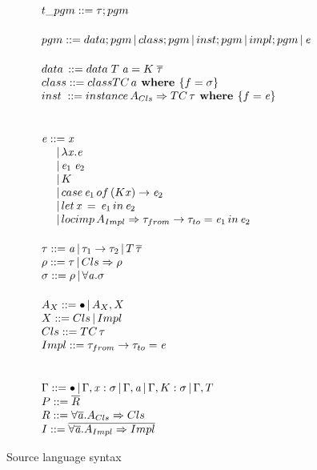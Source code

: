 \documentclass{article}
\begin{document}
\begin{figure}
  \[
\begin{array}{@{\hspace{0mm}}l@{\hspace{0mm}}}  
  t\_pgm ::= \type;pgm\\[5mm]
  pgm ::= data;pgm\,|\,class;pgm\,|\,inst;pgm\,|\,impl;pgm\,|\,\term
  \\[5mm]
 data\,::= data\;T\;\tyVar=K\;\overline{\type}\\
 class ::=class TC\,a\textbf{ where }\{f=\typeS\}\\
 inst\;::=instance\,A_{Cls}\Rightarrow TC \,\type\textbf{ where }\{f=\term\}\\

  \\[5mm]

  \term ::= \tmVar\\
  \phantom{\term ::}|\,\lambda \tmVar.\term\\
  \phantom{\term ::}|\,\term_1 \; \term_2\\
  \phantom{\term ::}|\, K\\
  \phantom{\term ::}|\, case \, \term_1 \, of\, (K \tmVar) \rightarrow \term_2\\
  \phantom{\term ::}|\, let \, \tmVar \, =\, \term_1 \,in\, \term_2  \\
  \phantom{\term ::}|\, \iLocal{A_{Impl}}{\type_{from}}{\type_{to}}{\term_1}{\term_2}
  \\[5mm]
  \type ::= \tyVar\,|\,\type_1\to\type_2\,|\,T\,\overline{\type}\\
  \qtype ::= \type\,|\,Cls \Rightarrow \qtype\\
  \typeS ::= \qtype\,|\,\forall\tyVar.\typeS
  \\[5mm]
  A_X ::= \bullet\,|\,A_X,X\\
  X ::= Cls\,|\,Impl\\
  Cls ::= TC\,\type\\
  Impl ::= \type_{from}\to\type_{to}=\term\\
  \\[5mm]
  \tyEnv::=\bullet\,|\,\tyEnv,\tmVar:\typeS\,|\,\tyEnv,\tyVar\,|\,\tyEnv,K:\typeS\,|\,\tyEnv,T\\
  \thEnv::=\overline{R}\\
  R ::= \forall\overline{\tyVar}.A_{Cls}\Rightarrow Cls\\
  \imEnv::=\overline{\forall \overline{\tyVar}.A_{Impl}\Rightarrow Impl}
  \end{array}
\]
  \caption{Source language syntax}
\end{figure}
\end{document}

